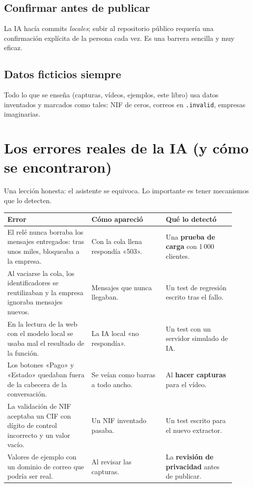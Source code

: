 \subsection{Confirmar antes de publicar}
La IA hacía commits \emph{locales}; subir al repositorio público requería una confirmación explícita de la persona cada vez. Es una barrera sencilla y muy eficaz.

\subsection{Datos ficticios siempre}
Todo lo que se enseña (capturas, vídeos, ejemplos, este libro) usa datos inventados y marcados como tales: NIF de ceros, correos en \texttt{.invalid}, empresas imaginarias.

\section{Los errores reales de la IA (y cómo se encontraron)}
Una lección honesta: el asistente se equivoca. Lo importante es tener mecanismos que lo detecten.

\begin{center}
\small
\begin{tabular}{@{}p{0.34\linewidth}p{0.3\linewidth}p{0.28\linewidth}@{}}
\toprule
\textbf{Error} & \textbf{Cómo apareció} & \textbf{Qué lo detectó} \\
\midrule
El relé nunca borraba los mensajes entregados: tras unos miles, bloqueaba a la empresa. & Con la cola llena respondía «503». & Una \textbf{prueba de carga} con 1\,000 clientes. \\
Al vaciarse la cola, los identificadores se reutilizaban y la empresa ignoraba mensajes nuevos. & Mensajes que nunca llegaban. & Un test de regresión escrito tras el fallo. \\
En la lectura de la web con el modelo local se usaba mal el resultado de la función. & La IA local «no respondía». & Un test con un servidor simulado de IA. \\
Los botones «Pago» y «Estado» quedaban fuera de la cabecera de la conversación. & Se veían como barras a todo ancho. & Al \textbf{hacer capturas} para el vídeo. \\
La validación de NIF aceptaba un CIF con dígito de control incorrecto y un valor vacío. & Un NIF inventado pasaba. & Un test escrito para el nuevo extractor. \\
Valores de ejemplo con un dominio de correo que podría ser real. & Al revisar las capturas. & La \textbf{revisión de privacidad} antes de publicar. \\
\bottomrule
\end{tabular}
\end{center}

